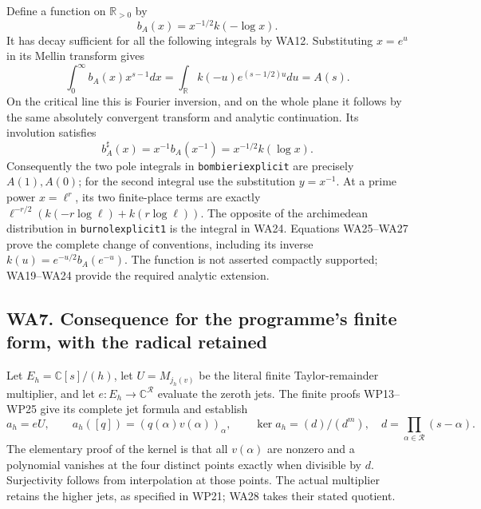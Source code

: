 \documentclass[
  10pt,
  a4paper,
]{article}
\begin{document}
Define a function on \(\mathbb R_{>0}\) by \[
b_A(x)=x^{-1/2}k(-\log x).
\tag{WA25}
\] It has decay sufficient for all the following integrals by WA12.
Substituting \(x=e^u\) in its Mellin transform gives \[
\int_0^\infty b_A(x)x^{s-1}dx
=\int_{\mathbb R}k(-u)e^{(s-1/2)u}du=A(s).
\tag{WA26}
\] On the critical line this is Fourier inversion, and on the whole
plane it follows by the same absolutely convergent transform and
analytic continuation. Its involution satisfies \[
b_A^\sharp(x)=x^{-1}b_A(x^{-1})=x^{-1/2}k(\log x).
\tag{WA27}
\] Consequently the two pole integrals in \texttt{bombieriexplicit} are
precisely \(A(1),A(0)\); for the second integral use the substitution
\(y=x^{-1}\). At a prime power \(x=\ell^r\), its two finite-place terms
are exactly \(\ell^{-r/2}(k(-r\log\ell)+k(r\log\ell))\). The opposite of
the archimedean distribution in \texttt{burnolexplicit1} is the integral
in WA24. Equations WA25--WA27 prove the complete change of conventions,
including its inverse \(k(u)=e^{-u/2}b_A(e^{-u})\). The function is not
asserted compactly supported; WA19--WA24 provide the required analytic
extension.

\subsection{WA7. Consequence for the programme's finite form, with the
radical
retained}\label{wa7.-consequence-for-the-programmes-finite-form-with-the-radical-retained}

Let \(E_h=\mathbb C[s]/(h)\), let \(U=M_{j_h(v)}\) be the literal finite
Taylor-remainder multiplier, and let \(e:E_h\to\mathbb C^{\mathcal R}\)
evaluate the zeroth jets. The finite proofs WP13--WP25 give its complete
jet formula and establish \[
a_h=eU,\qquad a_h([q])=(q(\alpha)v(\alpha))_\alpha,\qquad
\ker a_h=(d)/(d^m),\quad d=\prod_{\alpha\in\mathcal R}(s-\alpha).
\tag{WA28}
\] The elementary proof of the kernel is that all \(v(\alpha)\) are
nonzero and a polynomial vanishes at the four distinct points exactly
when divisible by \(d\). Surjectivity follows from interpolation at
those points. The actual multiplier retains the higher jets, as
specified in WP21; WA28 takes their stated quotient.
\end{document}
